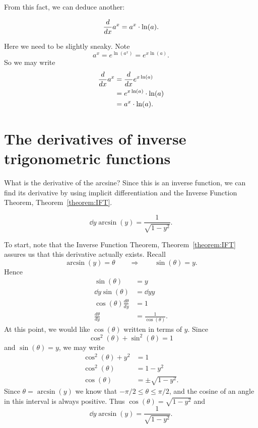\documentclass{ximera}
\begin{document}
From this fact, we can deduce another:

\begin{theorem}
  \[
  \frac{d}{dx} a^x = a^x\cdot \ln(a).
  \]
  \begin{explanation}
    Here we need to be slightly sneaky. Note
    \[
    a^x = e^{\ln(a^x)} = e^{x\ln(a)}.
    \]
    So we may write
    \begin{align*}
      \frac{d}{dx} a^x &= \frac{d}{dx} e^{x\ln(a)}\\
      &= e^{x\ln(a)} \cdot \ln(a)\\
      &= a^x\cdot \ln(a).
    \end{align*}
  \end{explanation}
\end{theorem}





\section{The derivatives of inverse trigonometric functions}

What is the derivative of the arcsine? Since this is an inverse
function, we can find its derivative by using implicit
differentiation and the Inverse Function Theorem, Theorem~\ref{theorem:IFT}.


\begin{theorem}
\[
\dd{y} \arcsin(y) = \frac{1}{\sqrt{1-y^2}}.
\]
\begin{explanation} 
To start, note that the Inverse Function Theorem,
Theorem~\ref{theorem:IFT} assures us that this derivative actually
exists.  Recall
\[
\arcsin(y) = \theta \qquad\Rightarrow\qquad \sin(\theta) = y.
\]
Hence
\begin{align*}
\sin(\theta) &= y\\
\dd{y} \sin(\theta) &= \dd{y} y \\
\cos(\theta) \frac{d\theta}{dy} &= 1 \\
\frac{d\theta}{dy} &= \frac{1}{\cos(\theta)}.
\end{align*}
At this point, we would like $\cos(\theta)$ written in terms of $y$. Since
\[
\cos^2(\theta)+\sin^2(\theta) =1
\]
and $\sin(\theta) = y$, we may write
\begin{align*}
\cos^2(\theta)+y^2 &=1\\
\cos^2(\theta) &=1-y^2\\
\cos(\theta) &= \pm \sqrt{1-y^2}.
\end{align*}
Since $\theta=\arcsin(y)$ we know that $-\pi/2\le \theta\le \pi/2$, and the cosine of
an angle in this interval is always positive. Thus
$\cos(\theta)=\sqrt{1-y^2}$ and 
\[
\dd{y} \arcsin(y) = \frac{1}{\sqrt{1-y^2}}.
\]
\end{explanation}
\end{theorem}
\end{document}
